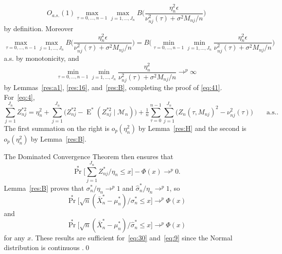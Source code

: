 \documentclass[11pt]{article}
\theoremstyle{definition}
\DeclareMathOperator{\E}{E}
\DeclareMathOperator{\pr}{Pr}
\begin{document}
\begin{equation*}
  O_{a.s.}(1) \max_{\tau = 0,\dots,n-1} \max_{j=1,\dots,J_n} B\Bigg(\frac{\eta_n^2\epsilon}{\nu_{nj}^2(\tau) + \sigma^2 M_{nj} / n}\Bigg)
\end{equation*}
by definition.  Moreover
\[\max_{\tau=0,\dots,n-1} \max_{j=1,\dots,J_n} B\Bigg(\frac{\eta_n^2 \epsilon}{\nu_{nj}^2(\tau) + \sigma^2 M_{nj} / n}\Bigg)
= B\Bigg(\min_{\tau=0,\dots,n-1} \min_{j=1,\dots,J_n} \frac{\eta_n^2 \epsilon}{\nu_{nj}^2(\tau) + \sigma^2 M_{nj} / n}\Bigg)\]
a.s. by monotonicity, and
\begin{equation*}
  \min_{\tau=0,\dots,n-1} \min_{j=1,\dots,J_n} \frac{\eta_n^2}{\nu_{nj}^2(\tau) + \sigma^2 M_{nj} / n} \to^p \infty
\end{equation*}
by Lemmas~\ref{res:a1}, \ref{res:16},
and~\ref{res:B}, completing the proof of \eqref{eq:41}.
For~\eqref{eq:4},
\begin{equation*}
  \sum_{j=1}^{J_n} Z_{nj}^{*2} = \eta_n^2 + \sum_{j=1}^{J_n}
  \big(Z_{nj}^{*2} - \E^*(Z_{nj}^{*2} \mid \mathcal{M}_n)\big) +
  \tfrac{1}{n} \sum_{\tau=0}^{n-1} \sum_{j=1}^{J_n} \big(Z_{n}(\tau,
  M_{nj})^2 - \nu_{nj}^2(\tau)\big) \qquad
  \text{a.s.}.
\end{equation*}
The first summation on the right is $o_p(\eta_n^2)$ by
Lemma~\ref{res:H} and the second is $o_p(\eta_n^2)$ by
Lemma~\ref{res:B}.

The Dominated Convergence Theorem then ensures that
\begin{equation}\label{eq:39}
  \pr^{*} \Big[\sum_{j=1}^{J_n}
  Z_{nj}^{*} / \eta_n \leq x \Big] - \Phi(x) \to^p 0.
\end{equation}
Lemma~\ref{res:B} proves that $\sigma_n^{*}/\eta_n \to^p 1$ and
$\hat{\sigma}_n^{*}/\eta_n \to^p 1$, so
\begin{equation}
  \label{eq:17}
  \pr^{*}\big[\sqrt{n}(\bar X_{n}^{*} - \mu_{n}^{*}) / \sigma_n^{*}
  \leq x\big] \to^p \Phi(x)
\end{equation}
and
\begin{equation}
  \label{eq:17}
  \pr^{*}\big[\sqrt{n}(\bar X_{n}^{*} - \mu_{n}^{*}) / \hat\sigma_n^{*}
  \leq x\big] \to^p \Phi(x)
\end{equation}
for any $x$.  These results are sufficient for~\eqref{eq:30}
and~\eqref{eq:9} since the Normal distribution is continuous
\citep[see, for example,][Lemma 2.11]{Vaa:00}.\qed
\end{document}
